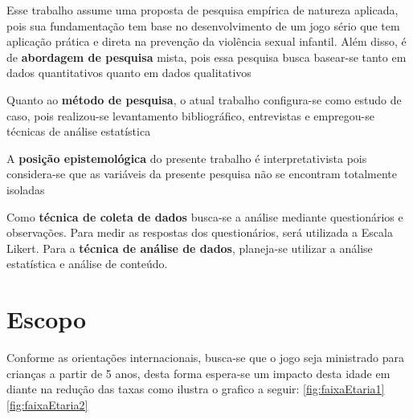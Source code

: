 Esse trabalho assume uma proposta de pesquisa empírica de natureza aplicada, pois sua fundamentação tem base no desenvolvimento de um jogo sério que tem aplicação prática e direta na prevenção da violência sexual infantil. Além disso, é de \textbf{abordagem de pesquisa} mista, pois essa pesquisa busca basear-se tanto em dados quantitativos quanto em dados qualitativos %

Quanto ao \textbf{método de pesquisa}, o atual trabalho configura-se como estudo de caso, pois realizou-se levantamento bibliográfico, entrevistas e empregou-se técnicas de análise estatística %

A \textbf{posição epistemológica} do presente trabalho é interpretativista pois considera-se que as variáveis da presente pesquisa não se encontram totalmente isoladas %

Como \textbf{técnica de coleta de dados} busca-se a análise mediante questionários e observações. Para medir as respostas dos questionários, será utilizada a Escala Likert. Para a \textbf{técnica de análise de dados}, planeja-se utilizar a análise estatística e análise de conteúdo.


\section{Escopo}\label{sec:Escopo}



Conforme as orientações internacionais, busca-se que o jogo seja ministrado para crianças a partir de 5 anos, desta forma espera-se um impacto desta idade em diante na redução das taxas como ilustra o grafico a seguir: \autoref{fig:faixaEtaria1} \autoref{fig:faixaEtaria2}

